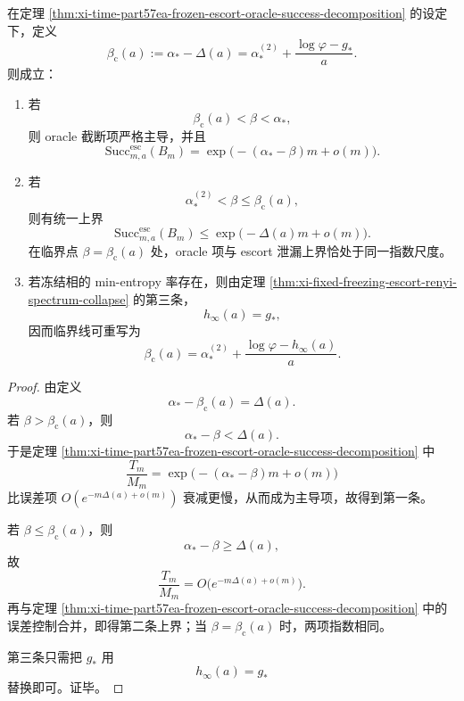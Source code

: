 \begin{theorem}\label{thm:xi-time-part57ea-oracle-escort-critical-line}
在定理 \ref{thm:xi-time-part57ea-frozen-escort-oracle-success-decomposition} 的设定下，定义
\[
\beta_{\mathrm c}(a)
:=
\alpha_*-\Delta(a)
=
\alpha_*^{(2)}+\frac{\log\varphi-g_*}{a}.
\]
则成立：
\begin{enumerate}
  \item 若
  \[
  \beta_{\mathrm c}(a)<\beta<\alpha_*,
  \]
  则 oracle 截断项严格主导，并且
  \[
  \boxed{\;
  \mathrm{Succ}_{m,a}^{\mathrm{esc}}(B_m)
  =
  \exp\!\bigl(-(\alpha_*-\beta)m+o(m)\bigr).\;}
  \]
  \item 若
  \[
  \alpha_*^{(2)}<\beta\le \beta_{\mathrm c}(a),
  \]
  则有统一上界
  \[
  \boxed{\;
  \mathrm{Succ}_{m,a}^{\mathrm{esc}}(B_m)
  \le
  \exp\!\bigl(-\Delta(a)m+o(m)\bigr).\;}
  \]
  在临界点 \(\beta=\beta_{\mathrm c}(a)\) 处，oracle 项与 escort 泄漏上界恰处于同一指数尺度。
  \item 若冻结相的 min-entropy 率存在，则由定理 \ref{thm:xi-fixed-freezing-escort-renyi-spectrum-collapse} 的第三条，
  \[
  h_\infty(a)=g_*,
  \]
  因而临界线可重写为
  \[
  \boxed{\;
  \beta_{\mathrm c}(a)
  =
  \alpha_*^{(2)}+\frac{\log\varphi-h_\infty(a)}{a}.\;}
  \]
\end{enumerate}
\end{theorem}
\begin{proof}
由定义
\[
\alpha_*-\beta_{\mathrm c}(a)=\Delta(a).
\]
若 \(\beta>\beta_{\mathrm c}(a)\)，则
\[
\alpha_*-\beta<\Delta(a).
\]
于是定理 \ref{thm:xi-time-part57ea-frozen-escort-oracle-success-decomposition} 中
\[
\frac{T_m}{M_m}
=
\exp\!\bigl(-(\alpha_*-\beta)m+o(m)\bigr)
\]
比误差项
\(
O(e^{-m\Delta(a)+o(m)})
\)
衰减更慢，从而成为主导项，故得到第一条。

若 \(\beta\le \beta_{\mathrm c}(a)\)，则
\[
\alpha_*-\beta\ge \Delta(a),
\]
故
\[
\frac{T_m}{M_m}
=
O\!\bigl(e^{-m\Delta(a)+o(m)}\bigr).
\]
再与定理 \ref{thm:xi-time-part57ea-frozen-escort-oracle-success-decomposition} 中的误差控制合并，即得第二条上界；当 \(\beta=\beta_{\mathrm c}(a)\) 时，两项指数相同。

第三条只需把 \(g_*\) 用
\[
h_\infty(a)=g_*
\]
替换即可。证毕。
\end{proof}

\endinput
